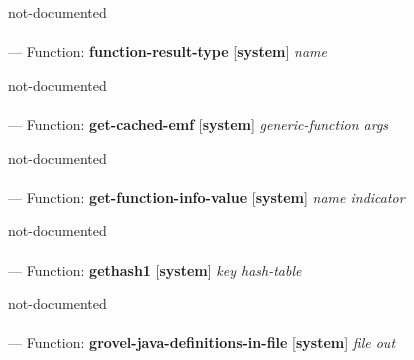 \begin{adjustwidth}{5em}{5em}
not-documented
\end{adjustwidth}

\paragraph{}
\label{SYSTEM:FUNCTION-RESULT-TYPE}
--- Function: \textbf{function-result-type} [\textbf{system}] \textit{name}

\begin{adjustwidth}{5em}{5em}
not-documented
\end{adjustwidth}

\paragraph{}
\label{SYSTEM:GET-CACHED-EMF}
--- Function: \textbf{get-cached-emf} [\textbf{system}] \textit{generic-function args}

\begin{adjustwidth}{5em}{5em}
not-documented
\end{adjustwidth}

\paragraph{}
\label{SYSTEM:GET-FUNCTION-INFO-VALUE}
--- Function: \textbf{get-function-info-value} [\textbf{system}] \textit{name indicator}

\begin{adjustwidth}{5em}{5em}
not-documented
\end{adjustwidth}

\paragraph{}
\label{SYSTEM:GETHASH1}
--- Function: \textbf{gethash1} [\textbf{system}] \textit{key hash-table}

\begin{adjustwidth}{5em}{5em}
not-documented
\end{adjustwidth}

\paragraph{}
\label{SYSTEM:GROVEL-JAVA-DEFINITIONS-IN-FILE}
--- Function: \textbf{grovel-java-definitions-in-file} [\textbf{system}] \textit{file out}

